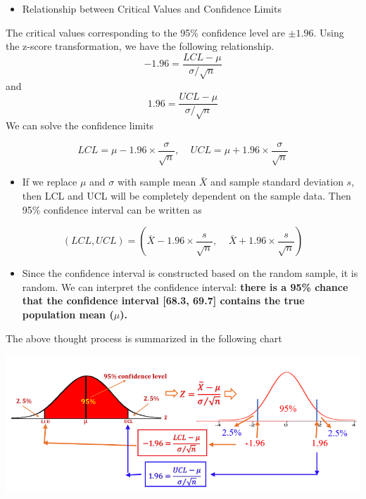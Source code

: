 \documentclass[
]{book}
\providecommand{\tightlist}{%
  \setlength{\itemsep}{0pt}\setlength{\parskip}{0pt}}
\begin{document}
\hfill\break

\begin{itemize}
\tightlist
\item
  Relationship between Critical Values and Confidence Limits
\end{itemize}

The critical values corresponding to the 95\% confidence level are \(\pm 1.96\). Using the z-score transformation, we have the following relationship.
\[
-1.96 = \frac{LCL - \mu}{\sigma/\sqrt{n}}
\]
and
\[
1.96 = \frac{UCL - \mu}{\sigma/\sqrt{n}}
\]
We can solve the confidence limits

\[
LCL = \mu - 1.96\times \frac{\sigma}{\sqrt{n}}, \ \ \ \ \  UCL =  \mu + 1.96\times \frac{\sigma}{\sqrt{n}}
\]

\begin{itemize}
\tightlist
\item
  If we replace \(\mu\) and \(\sigma\) with sample mean \(\bar{X}\) and sample standard deviation \(s\), then LCL and UCL will be completely dependent on the sample data. Then 95\% confidence interval can be written as
\end{itemize}

\[
(LCL, UCL) = (\bar{X} - 1.96\times \frac{s}{\sqrt{n}}, \ \ \ \ \ \bar{X} + 1.96\times \frac{s}{\sqrt{n}})
\]

\begin{itemize}
\tightlist
\item
  Since the confidence interval is constructed based on the random sample, it is random. We can interpret the confidence interval: \textbf{there is a 95\% chance that the confidence interval {[}68.3, 69.7{]} contains the true population mean (\(\mu\)).}
\end{itemize}

\hfill\break
The above thought process is summarized in the following chart

\begin{center}\includegraphics[width=0.8\linewidth]{week06/summaryCIProcess} \end{center}
\end{document}
